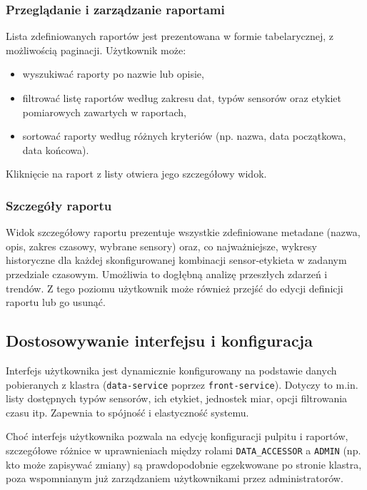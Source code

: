 
\newpage

\subsubsection{Przeglądanie i zarządzanie raportami}

Lista zdefiniowanych raportów jest prezentowana w formie tabelarycznej, z możliwością paginacji. Użytkownik może:

\begin{itemize}
    \item wyszukiwać raporty po nazwie lub opisie,
    \item filtrować listę raportów według zakresu dat, typów sensorów oraz etykiet pomiarowych zawartych w raportach,
    \item sortować raporty według różnych kryteriów (np. nazwa, data początkowa, data końcowa).
\end{itemize}

Kliknięcie na raport z listy otwiera jego szczegółowy widok.



\subsubsection{Szczegóły raportu}
Widok szczegółowy raportu prezentuje wszystkie zdefiniowane metadane (nazwa, opis, zakres czasowy, wybrane sensory) oraz, co najważniejsze, wykresy historyczne dla każdej skonfigurowanej kombinacji sensor-etykieta w zadanym przedziale czasowym. Umożliwia to dogłębną analizę przeszłych zdarzeń i trendów. Z tego poziomu użytkownik może również przejść do edycji definicji raportu lub go usunąć.


\subsection{Dostosowywanie interfejsu i konfiguracja}
Interfejs użytkownika jest dynamicznie konfigurowany na podstawie danych pobieranych z klastra (\texttt{data-service} poprzez \texttt{front-service}). Dotyczy to m.in. listy dostępnych typów sensorów, ich etykiet, jednostek miar, opcji filtrowania czasu itp. Zapewnia to spójność i elastyczność systemu.

Choć interfejs użytkownika pozwala na edycję konfiguracji pulpitu i raportów, szczegółowe różnice w uprawnieniach między rolami \texttt{DATA\_ACCESSOR} a \texttt{ADMIN} (np. kto może zapisywać zmiany) są prawdopodobnie egzekwowane po stronie klastra, poza wspomnianym już zarządzaniem użytkownikami przez administratorów. 

